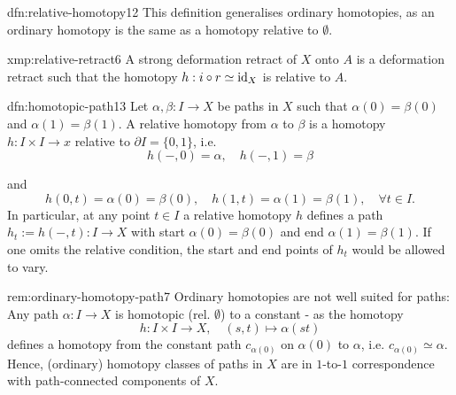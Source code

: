 \documentclass[landscape, 8pt]{extarticle}
\begin{document}
\begin{multicols*}{3}
\begin{dfn}{dfn:relative-homotopy}{12}
	\tcbline
	This definition generalises ordinary homotopies, as an ordinary homotopy is the same as a homotopy relative to $\emptyset$.
\end{dfn}

\vspace{-7pt}
\begin{xmp}{xmp:relative-retract}{6}
	A strong deformation retract of $X$ onto $A$ is a deformation retract such that the homotopy $h : i \circ r \simeq \operatorname{id}_{X}$ is relative to $A$.
\end{xmp}

\vspace{-7pt}
\begin{dfn}{dfn:homotopic-path}{13}
	Let $\alpha, \beta : I \to X$ be paths in $X$ such that $\alpha(0) = \beta(0)$ and $\alpha(1) = \beta(1)$. A relative homotopy from $\alpha$ to $\beta$ is a homotopy $h : I \times I \to x$ relative to $\partial I = \{0,1\}$, i.e.
	\begin{equation}
		h(-, 0) = \alpha, \quad h(-, 1) = \beta
	\end{equation}
	\par\vspace{-3pt}
	and
	\begin{equation}
		h(0, t) = \alpha(0) = \beta(0), \quad h(1,t)=\alpha(1)=\beta(1), \quad \forall t\in I.
	\end{equation}
	\tcbline
	In particular, at any point $t\in I$ a relative homotopy $h$ defines a path $h_{t} := h(-, t) : I \to X$ with start $\alpha(0) = \beta(0)$ and end $\alpha(1) = \beta(1)$. If one omits the relative condition, the start and end points of $h_{t}$ would be allowed to vary.
\end{dfn}

\vspace{-7pt}
\begin{rem}{rem:ordinary-homotopy-path}{7}
	Ordinary homotopies are not well suited for paths: Any path $\alpha : I \to X$ is homotopic (rel. $\emptyset$) to a constant - as the homotopy
	\[h : I \times I \to X, \quad (s, t) \mapsto \alpha(st)\]
	defines a homotopy from the constant path $c_{\alpha(0)}$ on $\alpha(0)$ to $\alpha$, i.e. $c_{\alpha(0)}\simeq \alpha$. Hence, (ordinary) homotopy classes of paths in $X$ are in $1$-to-$1$ correspondence with path-connected components of $X$.
\end{rem}


\end{multicols*}
\end{document}
